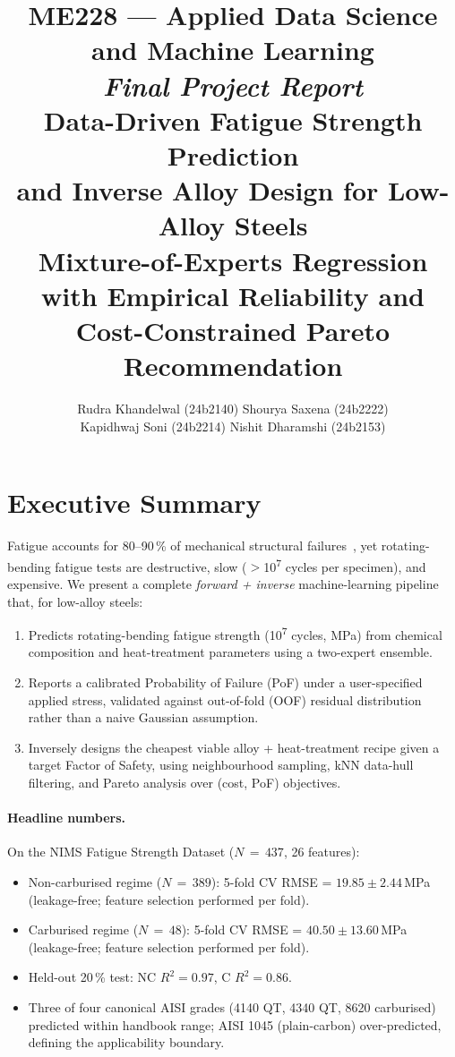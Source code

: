 \documentclass[12pt,a4paper]{article}
\title{
  \Large\textbf{ME228 --- Applied Data Science and Machine Learning}\\[2pt]
  \large\textit{Final Project Report}\\[6pt]
  \LARGE Data-Driven Fatigue Strength Prediction\\
         and Inverse Alloy Design for Low-Alloy Steels\\[8pt]
  \large Mixture-of-Experts Regression with Empirical Reliability and\\
         Cost-Constrained Pareto Recommendation
}
\author{
  Rudra Khandelwal (24b2140) \quad Shourya Saxena (24b2222) \\[2pt]
  Kapidhwaj Soni (24b2214) \quad Nishit Dharamshi (24b2153)
}
\begin{document}
\maketitle
\tableofcontents
\newpage

\section{Executive Summary}

Fatigue accounts for 80--90\,\% of mechanical structural failures~\cite{agrawal2014}, yet
rotating-bending fatigue tests are destructive, slow ($>$10\textsuperscript{7} cycles per
specimen), and expensive. We present a complete \emph{forward + inverse} machine-learning
pipeline that, for low-alloy steels:

\begin{enumerate}[nosep]
  \item Predicts rotating-bending fatigue strength (10\textsuperscript{7} cycles, MPa) from
        chemical composition and heat-treatment parameters using a two-expert ensemble.
  \item Reports a calibrated Probability of Failure (PoF) under a user-specified applied
        stress, validated against out-of-fold (OOF) residual distribution rather than a naive
        Gaussian assumption.
  \item Inversely designs the cheapest viable alloy + heat-treatment recipe given a target
        Factor of Safety, using neighbourhood sampling, kNN data-hull filtering, and Pareto
        analysis over (cost, PoF) objectives.
\end{enumerate}

\paragraph{Headline numbers.}
On the NIMS Fatigue Strength Dataset ($N\,{=}\,437$, 26 features):
\begin{itemize}[nosep]
  \item Non-carburised regime ($N\,{=}\,389$): 5-fold CV RMSE = $19.85 \pm 2.44$\,MPa
        (leakage-free; feature selection performed per fold).
  \item Carburised regime ($N\,{=}\,48$): 5-fold CV RMSE = $40.50 \pm 13.60$\,MPa
        (leakage-free; feature selection performed per fold).
  \item Held-out 20\,\% test: NC $R^2 = 0.97$, C $R^2 = 0.86$.
  \item Three of four canonical AISI grades (4140 QT, 4340 QT, 8620 carburised) predicted
        within handbook range; AISI 1045 (plain-carbon) over-predicted, defining the
        applicability boundary.
\end{itemize}
\end{document}

